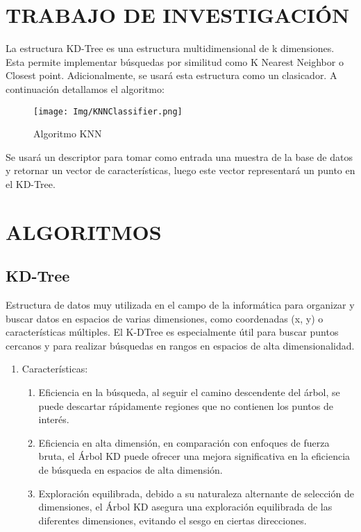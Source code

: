 \documentclass{article}
\begin{document}
\begin{sloppypar}
\section{TRABAJO DE INVESTIGACIÓN}
La estructura KD-Tree es una estructura multidimensional de k dimensiones. Esta permite implementar búsquedas por similitud como K Nearest Neighbor o Closest point. Adicionalmente, se usará esta estructura como un clasicador. A continuación detallamos el algoritmo:
\begin{figure}[H]
    \centering
    \texttt{[image: Img/KNNClassifier.png]}
    
    \caption{\label{fig:algoritmoClassifier}Algoritmo KNN}
\end{figure}
Se usará un descriptor para tomar como entrada una muestra de la base de datos y retornar un vector de características, luego este vector representará un punto en el KD-Tree. 


\section{ALGORITMOS}

\subsection{KD-Tree}
Estructura de datos muy utilizada en el campo de la informática para organizar y buscar datos en espacios de varias dimensiones, como coordenadas (x, y) o características múltiples. 
El K-DTree es especialmente útil para buscar puntos cercanos y para realizar búsquedas en rangos en espacios de alta dimensionalidad. \cite{Bishop2006PRML}



\begin{enumerate}
    \item Características:       
    \begin{enumerate}
       \item Eficiencia en la búsqueda, al seguir el camino descendente del árbol, se puede descartar rápidamente regiones que no contienen los puntos de interés.
       \item Eficiencia en alta dimensión, en comparación con enfoques de fuerza bruta, el Árbol KD puede ofrecer una mejora significativa en la eficiencia de búsqueda en espacios de alta dimensión.
       \item Exploración equilibrada, debido a su naturaleza alternante de selección de dimensiones, el Árbol KD asegura una exploración equilibrada de las diferentes dimensiones, evitando el sesgo en ciertas direcciones.
    \end{enumerate}
    

\end{enumerate}
\end{sloppypar}
\end{document}
